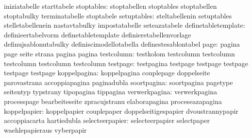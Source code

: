                                   iniziatabelle                    starttabele
                      stoptables: stoptabellen                     stoptables
                                  stoptabellen                     stoptabulky
                                  terminatabelle                   stoptabele
                     setuptables: steltabellenin                   setuptables
                                  stelletabellenein                nastavtabulky
                                  impostatabelle                   seteazatabele
             definetabletemplate: definieertabelvorm               definetabletemplate
                                  definieretabellenvorlage         definujsablonutabulky
                                  definiscimodellotabella          definestesablontabel
                            page: pagina                           page
                                  seite                            strana
                                  pagina                           pagina
                      testcolumn: testkolom                        testcolumn
                                  testcolumn                       testcolumn
                                  testcolumn                       testcolumn
                        testpage: testpagina                       testpage
                                  testpage                         testpage
                                  testpage                         testpage
                    koppelpagina: koppelpagina                     couplepage
                                  doppelseite                      parovastrana
                                  accoppiapagina                   paginadubla
                     soortpagina: soortpagina                      pagetype
                                  seitentyp                        typstrany
                                  tipopagina                       tippagina
                   verwerkpagina: verwerkpagina                    processpage
                                  bearbeiteseite                   zpracujstranu
                                  elaborapagina                    proceseazapagina
                    koppelpapier: koppelpapier                     couplepaper
                                  doppelseitigespapier             dvoustrannypapir
                                  accoppiacarta                    hartiedubla
                 selecteerpapier: selecteerpapier                  selectpaper
                                  waehlepapieraus                  vyberpapir
